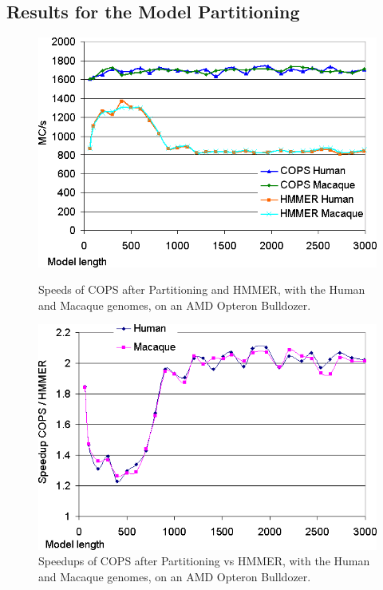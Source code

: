 \subsection{Results for the Model Partitioning}
\label{Results for the Model Partitioning}

\begin{figure}[H]
    \begin{minipage}{0.48\linewidth}
		\centering
		\includegraphics[scale=0.46]{graphics/partitions-aleph-runtimes.png}
		\caption[Speeds for the Inter-task vectorization on an AMD Opteron Bulldozer] 
		{Speeds of COPS after Partitioning and HMMER, with the Human and Macaque genomes, on an AMD Opteron Bulldozer.}
		\label{partitions-aleph-runtimes}
    \end{minipage}
    \hspace{0.04\linewidth}
    \begin{minipage}{0.48\linewidth}
		\centering
		\includegraphics[scale=0.46]{graphics/partitions-aleph-speedups.png}
		\caption[Speedups for the Inter-task vectorization on an AMD Opteron Bulldozer] 
		{Speedups of COPS after Partitioning vs HMMER, with the Human and Macaque genomes, on an AMD Opteron Bulldozer.}
		\label{partitions-aleph-speedups}
    \end{minipage}
\end{figure} 

